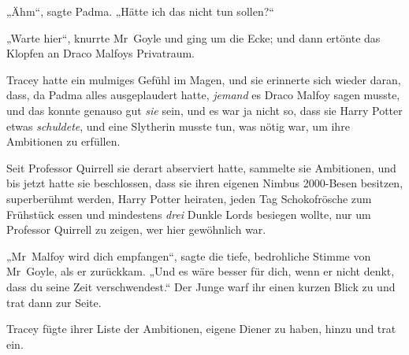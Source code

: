 „Ähm“, sagte Padma.
„Hätte ich das nicht tun sollen?“

\later

„Warte hier“, knurrte Mr~Goyle und ging um die Ecke; und dann ertönte das Klopfen an Draco Malfoys Privatraum.

Tracey hatte ein mulmiges Gefühl im Magen, und sie erinnerte sich wieder daran, dass, da Padma alles ausgeplaudert hatte, \emph{jemand} es Draco Malfoy sagen musste, und das konnte genauso gut \emph{sie} sein, und es war ja nicht so, dass sie Harry Potter etwas \emph{schuldete}, und eine Slytherin musste tun, was nötig war, um ihre Ambitionen zu erfüllen.

Seit Professor Quirrell sie derart abserviert hatte, sammelte sie Ambitionen, und bis jetzt hatte sie beschlossen, dass sie ihren eigenen Nimbus 2000-Besen besitzen, superberühmt werden, Harry Potter heiraten, jeden Tag Schokofrösche zum Frühstück essen und mindestens \emph{drei} Dunkle Lords besiegen wollte, nur um Professor Quirrell zu zeigen, wer hier gewöhnlich war.

„Mr~Malfoy wird dich empfangen“, sagte die tiefe, bedrohliche Stimme von Mr~Goyle, als er zurückkam.
„Und es wäre besser für dich, wenn er nicht denkt, dass du seine Zeit verschwendest.“ Der Junge warf ihr einen kurzen Blick zu und trat dann zur Seite.

Tracey fügte ihrer Liste der Ambitionen, eigene Diener zu haben, hinzu und trat ein.

